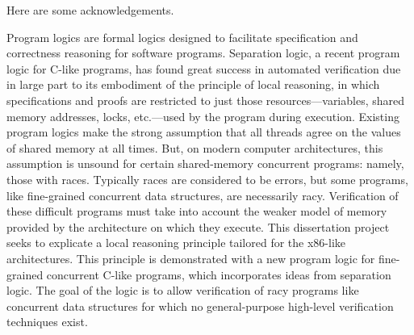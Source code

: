 \documentclass[11pt]{report}         %
\begin{document}
\thesiscopyrightpage                 %

\thesiscertificationpage             %

\thesistitlepage                     %


\thesisdedicationpage                %

\begin{thesisacknowledgments}
Here are some acknowledgements. 
\end{thesisacknowledgments}

\begin{thesisabstract}
    Program logics are formal logics designed to facilitate specification and correctness reasoning for software programs. Separation logic, a recent program logic for C-like programs, has found great success in automated verification due in large part to its embodiment of the principle of local reasoning, in which specifications and proofs are restricted to just those resources---variables, shared memory addresses, locks, etc.---used by the program during execution. Existing program logics make the strong assumption that all threads agree on the values of shared memory at all times. But, on modern computer architectures, this assumption is unsound for certain shared-memory concurrent programs: namely, those with races. Typically races are considered to be errors, but some programs, like fine-grained concurrent data structures, are necessarily racy. Verification of these difficult programs must take into account the weaker model of memory provided by the architecture on which they execute. This dissertation project seeks to explicate a local reasoning principle tailored for the x86-like architectures. This principle is demonstrated with a new program logic for fine-grained concurrent C-like programs, which incorporates ideas from separation logic. The goal of the logic is to allow verification of racy programs like concurrent data structures for which no general-purpose high-level verification techniques exist. 
\end{thesisabstract}

\tableofcontents                     %
\listoffigures                     %
\end{document}
